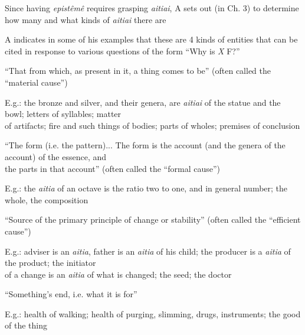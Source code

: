 \documentclass[oneside]{article}
\begin{document}
\noindent Since having \emph{epist\^{e}m\^{e}} requires grasping \emph{aitiai}, A sets out (in Ch. 3) to determine how many and what kinds of \emph{aitiai} there are
\vspace*{2mm}

\noindent A indicates in some of his examples that these are 4 kinds of entities that can be cited in response to various questions of the form ``Why is \emph{X} F?''
\vspace*{2mm}

\noindent [1] ``That from which, as present in it, a thing comes to be'' (often called the ``material cause'')
\vspace*{1mm}

E.g.: the bronze and silver, and their genera, are \emph{aitiai} of the statue and the bowl; letters of syllables; matter\\\hspace*{6mm}of artifacts; fire and such things of bodies; parts of wholes; premises of conclusion
\vspace*{2mm}

\noindent [2] ``The form (i.e. the pattern)... The form is the account (and the genera of the account) of the essence, and\\\hspace*{6mm}the parts in that account'' (often called the ``formal cause'')
\vspace*{1mm}

E.g.: the \emph{aitia} of an octave is the ratio two to one, and in general number; the whole, the composition
\vspace*{2mm}

\noindent [3] ``Source of the primary principle of change or stability'' (often called the ``efficient cause'')
\vspace*{1mm}

E.g.: adviser is an \emph{aitia}, father is an \emph{aitia} of his child; the producer is a \emph{aitia} of the product; the initiator\\\hspace*{6mm}of a change is an \emph{aitia} of what is changed; the seed; the doctor
\vspace*{2mm}

\noindent [4] ``Something's end, i.e. what it is for''
\vspace*{1mm}

E.g.: health of walking; health of purging, slimming, drugs, instruments; the good of the thing
\vspace*{2mm}
\end{document}
